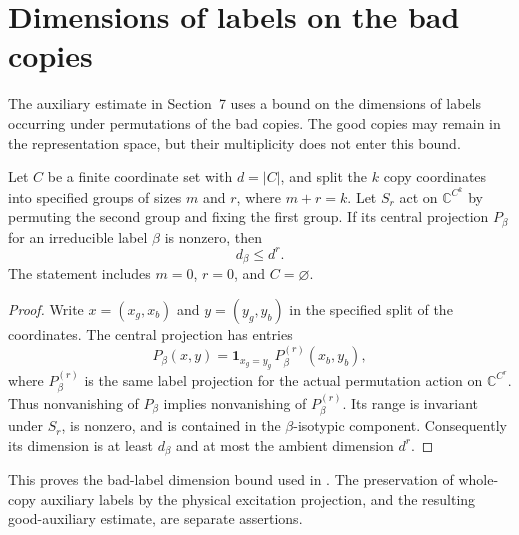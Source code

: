 \section{Dimensions of labels on the bad copies}
\label{sec:bad_copy_label_dimension}

The auxiliary estimate in Section~7 uses a bound on the dimensions of labels
occurring under permutations of the bad copies. The good copies may remain
in the representation space, but their multiplicity does not enter this bound.

\begin{theorem}
\label{thm:bad_copy_label_dimension}
\leanok
Let $C$ be a finite coordinate set with $d=|C|$, and split the $k$ copy
coordinates into specified groups of sizes $m$ and $r$, where $m+r=k$.
Let $S_r$ act on $\mathbb C^{C^k}$ by permuting the second group and fixing
the first group. If its central projection $P_\beta$ for an irreducible
label $\beta$ is nonzero, then
\[
 d_\beta\le d^r.
\]
The statement includes $m=0$, $r=0$, and $C=\varnothing$.
\end{theorem}
\begin{proof}
\leanok
Write $x=(x_g,x_b)$ and $y=(y_g,y_b)$ in the specified split of the
coordinates. The central projection has entries
\[
 P_\beta(x,y)=\mathbf 1_{x_g=y_g}\,P^{(r)}_\beta(x_b,y_b),
\]
where $P^{(r)}_\beta$ is the same label projection for the actual
permutation action on $\mathbb C^{C^r}$. Thus nonvanishing of $P_\beta$
implies nonvanishing of $P^{(r)}_\beta$. Its range is invariant under
$S_r$, is nonzero, and is contained in the $\beta$-isotypic component.
Consequently its dimension is at least $d_\beta$ and at most the ambient
dimension $d^r$.
\end{proof}

This proves the bad-label dimension bound used in
\cite[Section~7, equation \textup{(comparator:good-auxiliary)}]{OpenAI2026AreaLaw}.
The preservation of whole-copy auxiliary labels by the physical excitation
projection, and the resulting good-auxiliary estimate, are separate assertions.
